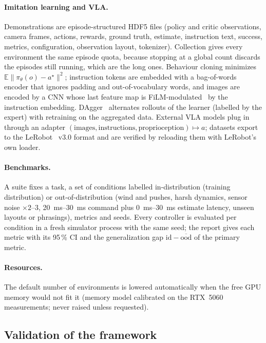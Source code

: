 \paragraph{Imitation learning and VLA.} Demonstrations are episode-structured HDF5 files (policy and critic
observations, camera frames, actions, rewards, ground truth, estimate, instruction text, success, metrics,
configuration, observation layout, tokenizer). Collection gives every environment the same episode quota, because
stopping at a global count discards the episodes still running, which are the long ones. Behaviour cloning minimizes
$\mathbb E\|\pi_\theta(o)-a^\star\|^2$; instruction tokens are embedded with a bag-of-words encoder that ignores
padding and out-of-vocabulary words, and images are encoded by a CNN whose last feature map is FiLM-modulated~\cite{perez2018film} by the
instruction embedding. DAgger~\cite{ross2011dagger} alternates rollouts of the learner (labelled by the expert) with retraining on the
aggregated data. External VLA models plug in through an adapter $(\text{images},\text{instructions},
\text{proprioception})\mapsto a$; datasets export to the LeRobot~\cite{cadene2024lerobot} v3.0 format and are verified by reloading them with
LeRobot's own loader.

\paragraph{Benchmarks.} A suite fixes a task, a set of conditions labelled in-distribution (training distribution)
or out-of-distribution (wind and pushes, harsh dynamics, sensor noise $\times2$--3, \SIrange{20}{30}{ms} command plus
\SIrange{0}{30}{ms} estimate latency,
unseen layouts or phrasings), metrics and seeds. Every controller is evaluated per condition in a fresh simulator
process with the same seed; the report gives each metric with its 95\,\% CI and the generalization gap
$\text{id}-\overline{\text{ood}}$ of the primary metric.

\paragraph{Resources.} The default number of environments is lowered automatically when the free GPU memory would
not fit it (memory model calibrated on the RTX~5060 measurements; never raised unless requested).

\subsection{Validation of the framework}
